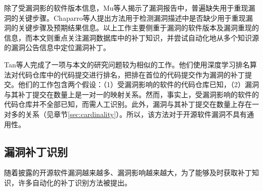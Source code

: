 除了受漏洞影的软件版本信息，Mu等人\cite{mu2018understanding}揭示了漏洞报告中，普遍缺失用于重现漏洞的关键步骤。Chaparro等人\cite{chaparro2017detecting}提出方法用于检测漏洞描述中是否缺少用于重现漏洞的关键步骤及预期结果信息。以上工作主要侧重于漏洞的软件版本及漏洞重现的信息，而本文则重点关注漏洞数据库中的补丁知识，并尝试自动化地从多个知识源的漏洞公告信息中定位漏洞补丁。

Tan等人完成了一项与本文的研究问题较为相似的工作\cite{Tan2021locating}。他们使用深度学习排名算法对代码仓库中的代码提交进行排名，把排在首位的代码提交作为漏洞的补丁提交。他们的工作包含两个假设：（1）受漏洞影响的软件的代码仓库已知，（2）漏洞与其补丁提交在数量上是一对一的映射关系。然而，事实上，受漏洞影响的软件的代码仓库并不全部已知，而需人工识别。此外，漏洞与其补丁提交在数量上存在一对多的关系（见章节\ref{sec:cardinality}）。所以，该方法对于开源软件漏洞不具有通用性。




\subsection{漏洞补丁识别}
随着披露的开源软件漏洞越来越多、漏洞影响越来越大，为了能够及时获取补丁知识，许多自动化的补丁识别方法被提出。

